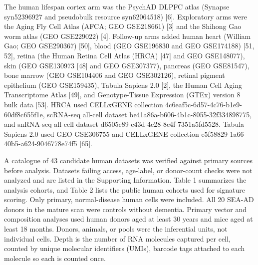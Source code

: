\documentclass[11pt]{article}
\begin{document}
The human lifespan cortex arm was the PsychAD DLPFC atlas (Synapse syn52396927 and pseudobulk resource syn62064518) [6]. Exploratory arms were the Aging Fly Cell Atlas (AFCA; GEO GSE218661) [3] and the Shihong Gao worm atlas (GEO GSE229022) [4]. Follow-up arms added human heart (William Gao; GEO GSE290367) [50], blood (GEO GSE196830 and GEO GSE174188) [51, 52], retina (the Human Retina Cell Atlas (HRCA) [47] and GEO GSE148077), skin (GEO GSE130973 [48] and GEO GSE307377), pancreas (GEO GSE81547), bone marrow (GEO GSE104406 and GEO GSE302126), retinal pigment epithelium (GEO GSE159435), Tabula Sapiens 2.0 [2], the Human Cell Aging Transcriptome Atlas [49], and Genotype-Tissue Expression (GTEx) version 8 bulk data [53]. HRCA used CELLxGENE collection 4c6eaf5c-6d57-4c76-b1e9-60df8c655f1e, scRNA-seq all-cell dataset be41a86a-b606-4b1c-8055-32f334898775, and snRNA-seq all-cell dataset d6505c89-c43d-4c28-8c4f-7351a5fd5528. Tabula Sapiens 2.0 used GEO GSE306755 and CELLxGENE collection e5f58829-1a66-40b5-a624-9046778e74f5 [65].

A catalogue of 43 candidate human datasets was verified against primary sources before analysis. Datasets failing access, age-label, or donor-count checks were not analyzed and are listed in the Supporting Information. Table 1 summarizes the analysis cohorts, and Table 2 lists the public human cohorts used for signature scoring. Only primary, normal-disease human cells were included. All 20 SEA-AD donors in the mature scan were controls without dementia. Primary vector and composition analyses used human donors aged at least 30 years and mice aged at least 18 months. Donors, animals, or pools were the inferential units, not individual cells. Depth is the number of RNA molecules captured per cell, counted by unique molecular identifiers (UMIs), barcode tags attached to each molecule so each is counted once.
\end{document}
